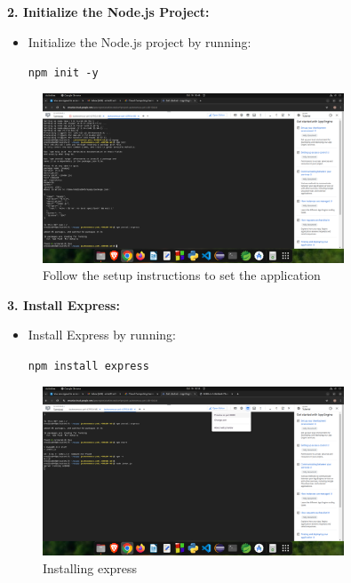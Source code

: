 \documentclass[12pt]{article}
\begin{document}
\begin{spacing}{1.5}
\begin{adjustwidth}{0cm}{0cm}
\begin{justify}
\textbf{2. Initialize the Node.js Project:}
\begin{itemize}
    \item Initialize the Node.js project by running:
    \begin{center}
    \texttt{npm init -y}
    \end{center}
\end{itemize}

\begin{figure}[H]
    \centering
    \includegraphics[width=0.8\textwidth]{exp 5/s16.png}
    \caption{Follow the setup instructions to set the application}
    \label{fig: 1}
\end{figure}

\textbf{3. Install Express:}
\begin{itemize}
    \item Install Express by running:
    \begin{center}
    \texttt{npm install express}
    \end{center}
\end{itemize}

\begin{figure}[H]
    \centering
    \includegraphics[width=0.8\textwidth]{exp 5/s20.png}
    \caption{Installing express}
    \label{fig: 1}
\end{figure}


\end{justify}
\end{adjustwidth}
\end{spacing}
\end{document}
